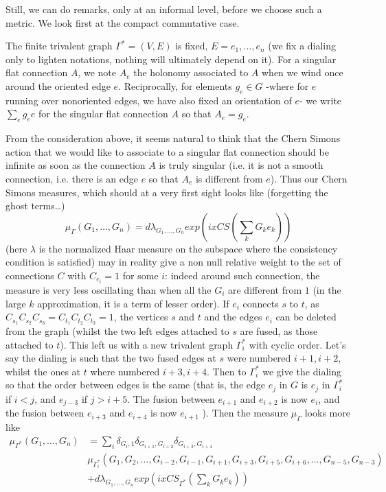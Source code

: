 \documentclass[10pt]{article}
\begin{document}
Still, we can do remarks, only at an informal level, before we choose such a metric. We look first at the compact commutative case.

The finite trivalent graph $\Gamma^*=(V,E)$ is fixed, $E=e_1,…,e_n$ (we fix a dialing only to lighten notations, nothing will ultimately depend on it). For a singular flat connection $A$, we note $A_e$ the holonomy associated to $A$ when we wind once around the oriented edge $e$. Reciprocally, for elements $g_e\in G$ -where for $e$ running over nonoriented edges, we have also fixed an orientation of $e$- we write $\sum_e  g_e e$ for the singular flat connection $A$ so that $A_e=g_e$.

From the consideration above, it seems natural to think that the Chern Simons action that we would like to associate to a singular flat connection should be infinite as soon as the connection $A$ is truly singular (i.e. it is not a smooth connection, i.e. there is an edge $e$ so that $A_e$ is different from $e$). Thus our Chern Simons measures, which should at a very first sight looks like (forgetting the ghost terms…) \[\mu_\Gamma(G_1,\dots,G_n)=d\lambda_{G_1,\dots , G_n} exp(i x CS(\sum_k G_k e_k))\] (here $\lambda$ is the normalized Haar measure on the subspace where the consistency condition is satisfied) may in reality give a non null relative weight to the set of connections $C$ with $C_{e_i}=1$ for some $i$: indeed around such connection, the measure is very less oscillating than when all the $G_i$ are different from $1$ (in the large $k$ approximation, it is a term of lesser order). If $e_i$ connects $s$ to $t$, as $C_{s_1}C_{s_2}C_{s_3}=C_{t_1}C_{t_2}C_{t_3}=1$,
the vertices $s$ and $t$ and the edges $e_i$ can be deleted from the graph (whilst the two left edges attached to $s$ are fused, as those attached to $t$). This left us with a new trivalent graph $\Gamma_i^*$ with cyclic order. Let's say the dialing is such that the two fused edges at $s$ were numbered $i+1,i+2$, whilst the ones at $t$ where numbered $i+3,i+4$. Then to $\Gamma_i^*$ we give the dialing so that the order between edges is the same (that is, the edge $e_j$ in $G$ is $e_j$ in $\Gamma_i^*$ if $i<j$, and $e_{j-3}$ if $j>i+5$. The fusion between $e_{i+1}$ and $e_{i+2}$ is now $e_i$, and the fusion between $e_{i+3}$ and $e_{i+4}$ is now $e_{i+1}$ ).
Then the measure $\mu_\Gamma$ looks more like \begin{align*}
\mu_{\Gamma^*}(G_1,\dots,G_n)&=\sum_i \delta_{G_i,1} \delta_{G_{i+1},G_{i+2}} \delta_{G_{i+3},G_{i+4}}  \\
&\mu_{\Gamma^*_i}(G_1, G_2,\dots,G_{i-2}, G_{i-1},G_{i+1},G_{i+3},G_{i+5},G_{i+6},\dots,G_{n-5}, G_{n-3})\\ &+ d\lambda_{G_1,\dots, G_n} exp(i x CS_{\Gamma^*} (\sum_k G_k e_k))\end{align*}
\end{document}
